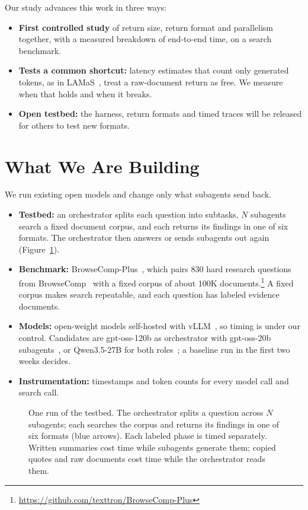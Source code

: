 \documentclass[11pt]{article}
\begin{document}
\noindent Our study advances this work in three ways:
\begin{itemize}
  \item \textbf{First controlled study} of return size, return format and parallelism together, with a measured breakdown of end-to-end time, on a search benchmark.
  \item \textbf{Tests a common shortcut:} latency estimates that count only generated tokens, as in LAMaS~\citep{shi2026lamas}, treat a raw-document return as free. We measure when that holds and when it breaks.
  \item \textbf{Open testbed:} the harness, return formats and timed traces will be released for others to test new formats.
\end{itemize}

\section{What We Are Building}
We run existing open models and change only what subagents send back.
\begin{itemize}
  \item \textbf{Testbed:} an orchestrator splits each question into subtasks, $N$ subagents search a fixed document corpus, and each returns its findings in one of six formats. The orchestrator then answers or sends subagents out again (Figure~\ref{fig:system}).
  \item \textbf{Benchmark:} BrowseComp-Plus~\citep{chen2025browsecompplus}, which pairs 830 hard research questions from BrowseComp~\citep{openai2025browsecomp} with a fixed corpus of about 100K documents.\footnote{\url{https://github.com/texttron/BrowseComp-Plus}} A fixed corpus makes search repeatable, and each question has labeled evidence documents.
  \item \textbf{Models:} open-weight models self-hosted with vLLM~\citep{kwon2023vllm}, so timing is under our control. Candidates are gpt-oss-120b as orchestrator with gpt-oss-20b subagents~\citep{openai2025gptoss}, or Qwen3.5-27B for both roles~\citep{qwen2026qwen35}; a baseline run in the first two weeks decides.
  \item \textbf{Instrumentation:} timestamps and token counts for every model call and search call.
\end{itemize}

\begin{figure}[!htbp]
  \centering
  \resizebox{\linewidth}{!}{}
  \caption{One run of the testbed. The orchestrator splits a question across $N$ subagents; each searches the corpus and returns its findings in one of six formats (blue arrows). Each labeled phase is timed separately. Written summaries cost time while subagents generate them; copied quotes and raw documents cost time while the orchestrator reads them.}
  \label{fig:system}
\end{figure}
\end{document}
